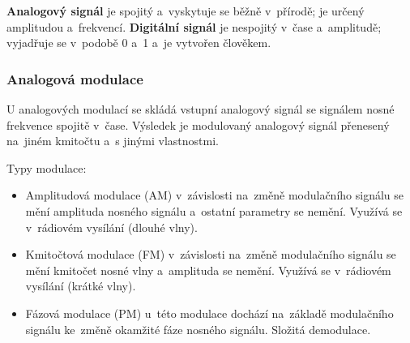\textbf{Analogový signál} je spojitý a~vyskytuje se běžně v~přírodě; je určený amplitudou a~frekvencí. \textbf{Digitální signál} je nespojitý v~čase a~amplitudě; vyjadřuje se v~podobě 0 a~1 a~je vytvořen člověkem.

\subsubsection{Analogová modulace}

U analogových modulací se skládá vstupní analogový signál se signálem nosné frekvence spojitě v~čase. Výsledek je modulovaný analogový signál přenesený na~jiném kmitočtu a~s jinými vlastnostmi.

Typy modulace:
\begin{itemize}[noitemsep]
    \item Amplitudová modulace (AM) v~závislosti na~změně modulačního signálu se mění amplituda nosného signálu a~ostatní parametry se nemění. Využívá se v~rádiovém vysílání (dlouhé vlny).
    \item Kmitočtová modulace (FM) v~závislosti na~změně modulačního signálu se mění kmitočet nosné vlny a~amplituda se nemění. Využívá se v~rádiovém vysílání (krátké vlny).
    \item Fázová modulace (PM) u~této modulace dochází na~základě modulačního signálu ke~změně okamžité fáze nosného signálu. Složitá demodulace.
\end{itemize}

